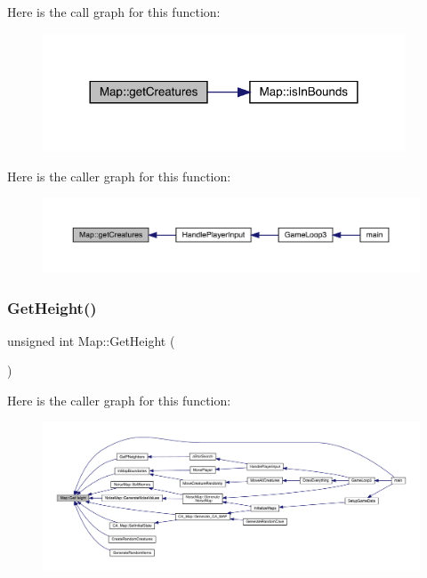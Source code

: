 Here is the call graph for this function\+:
\nopagebreak
\begin{figure}[H]
\begin{center}
\leavevmode
\includegraphics[width=305pt]{dd/d11/class_map_a5b232a4d35b914192077be84d35f3354_cgraph}
\end{center}
\end{figure}
Here is the caller graph for this function\+:
\nopagebreak
\begin{figure}[H]
\begin{center}
\leavevmode
\includegraphics[width=350pt]{dd/d11/class_map_a5b232a4d35b914192077be84d35f3354_icgraph}
\end{center}
\end{figure}
\mbox{\label{class_map_a5181eaa96c1d125523a2b16d0643bbd5}} 
\subsubsection{\texorpdfstring{Get\+Height()}{GetHeight()}}
{\footnotesize\ttfamily unsigned int Map\+::\+Get\+Height (\begin{DoxyParamCaption}{ }\end{DoxyParamCaption})}

Here is the caller graph for this function\+:
\nopagebreak
\begin{figure}[H]
\begin{center}
\leavevmode
\includegraphics[width=350pt]{dd/d11/class_map_a5181eaa96c1d125523a2b16d0643bbd5_icgraph}
\end{center}
\end{figure}
\mbox{\label{class_map_a5070fd388ce6f5ab71dd63475e28302c}} 

